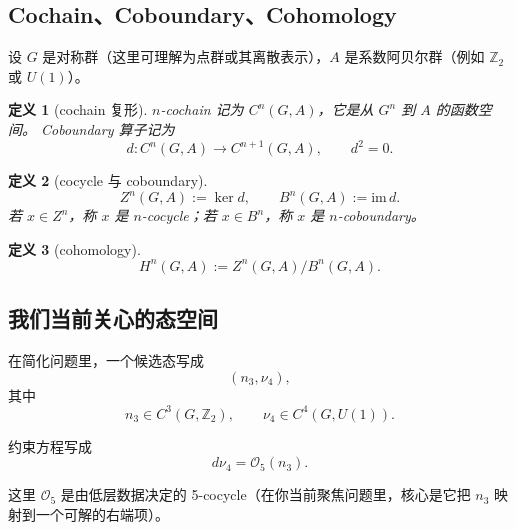 \documentclass[a4paper,fontset=ubuntu,12pt]{ctexart}
\newtheorem{definition}{定义}[section]
\begin{document}
\subsection{Cochain、Coboundary、Cohomology}

设 $G$ 是对称群（这里可理解为点群或其离散表示），$A$ 是系数阿贝尔群（例如 $\mathbb{Z}_2$ 或 $U(1)$）。

\begin{definition}[cochain 复形]
$n$-cochain 记为 $C^n(G,A)$，它是从 $G^n$ 到 $A$ 的函数空间。
Coboundary 算子记为
\begin{equation}
d: C^n(G,A)\to C^{n+1}(G,A),\qquad d^2=0.
\label{eq:d-square-zero}
\end{equation}
\end{definition}

\begin{definition}[cocycle 与 coboundary]
\begin{equation}
Z^n(G,A):=\ker d,\qquad B^n(G,A):=\mathrm{im}\,d.
\label{eq:zn-bn}
\end{equation}
若 $x\in Z^n$，称 $x$ 是 $n$-cocycle；若 $x\in B^n$，称 $x$ 是 $n$-coboundary。
\end{definition}

\begin{definition}[cohomology]
\begin{equation}
H^n(G,A):=Z^n(G,A)/B^n(G,A).
\label{eq:cohomology-def}
\end{equation}
\end{definition}

\subsection{我们当前关心的态空间}

在简化问题里，一个候选态写成
\begin{equation}
(n_3,\nu_4),
\label{eq:state-pair}
\end{equation}
其中
\begin{equation}
n_3\in C^3(G,\mathbb{Z}_2),\qquad \nu_4\in C^4(G,U(1)).
\label{eq:n3-nu4-space}
\end{equation}

约束方程写成
\begin{equation}
d\nu_4=\mathcal{O}_5(n_3).
\label{eq:nu4-eq}
\end{equation}

这里 $\mathcal{O}_5$ 是由低层数据决定的 5-cocycle（在你当前聚焦问题里，核心是它把 $n_3$ 映射到一个可解的右端项）。
\end{document}

